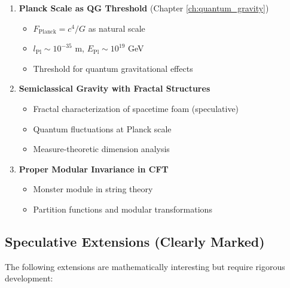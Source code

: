 \begin{framework}
\begin{enumerate}
    \item \textbf{Planck Scale as QG Threshold} (Chapter \ref{ch:quantum_gravity})
    \begin{itemize}
        \item $F_{\text{Planck}} = c^4/G$ as natural scale
        \item $l_{\text{Pl}} \sim 10^{-35}$ m, $E_{\text{Pl}} \sim 10^{19}$ GeV
        \item Threshold for quantum gravitational effects
    \end{itemize}

    \item \textbf{Semiclassical Gravity with Fractal Structures}
    \begin{itemize}
        \item Fractal characterization of spacetime foam (speculative)
        \item Quantum fluctuations at Planck scale
        \item Measure-theoretic dimension analysis
    \end{itemize}

    \item \textbf{Proper Modular Invariance in CFT}
    \begin{itemize}
        \item Monster module in string theory
        \item Partition functions and modular transformations
    \end{itemize}
\end{enumerate}
\end{framework}

\subsection{Speculative Extensions (Clearly Marked)}

The following extensions are mathematically interesting but require rigorous development:

